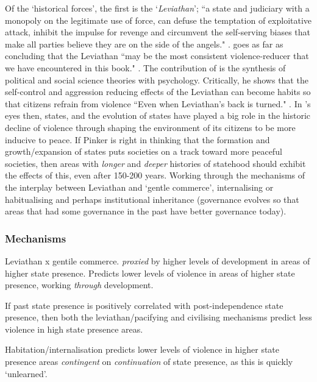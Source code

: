 \documentclass[12pt]{article}
\begin{document}
Of the `historical forces', the first is the `\textit{Leviathan}'; ``a state and
judiciary with a monopoly on the legitimate use of force, can defuse the
temptation of exploitative attack, inhibit the impulse for revenge and
circumvent the self-serving biases that make all parties believe they are on the
side of the angels." \citep[xxvi]{Pinker2012}. \citet{Pinker2012} goes as far as
concluding that the Leviathan ``may be the most consistent violence-reducer that
we have encountered in this book." \citep[680]{Pinker2012}. The contribution of
\citet{Pinker2012} is the synthesis of political and social science theories
with psychology. Critically, he shows that the self-control and aggression
reducing effects of the Leviathan can become habits so that citizens refrain
from violence ``Even when Leviathan's back is turned." \citep[681]{Pinker2012}. In
\citet{Pinker2012}'s eyes then, states, and the evolution of states have played
a big role in the historic decline of violence through shaping the environment
of its citizens to be more inducive to peace. If Pinker is right in thinking
that the formation and growth/expansion of states puts societies on a track
toward more peaceful societies, then areas with \textit{longer} and
\textit{deeper} histories of statehood should exhibit the effects of this, even
after 150-200 years. Working through the mechanisms of the interplay between
Leviathan and `gentle commerce', internalising or habitualising and perhaps
institutional inheritance (governance evolves so that areas that had some
governance in the past have better governance today).

\subsubsection{Mechanisms}

Leviathan x gentile commerce. \textit{proxied} by higher levels of development
in areas of higher state presence. Predicts lower levels of violence in areas of
higher state presence, working \textit{through} development.

If past state presence is positively correlated with post-independence state
presence, then both the leviathan/pacifying and civilising mechanisms predict
less violence in high state presence areas.

Habitation/internalisation predicts lower levels of violence in higher state
presence areas \textit{contingent} on \textit{continuation} of state presence,
as this is quickly `unlearned'.
\end{document}
